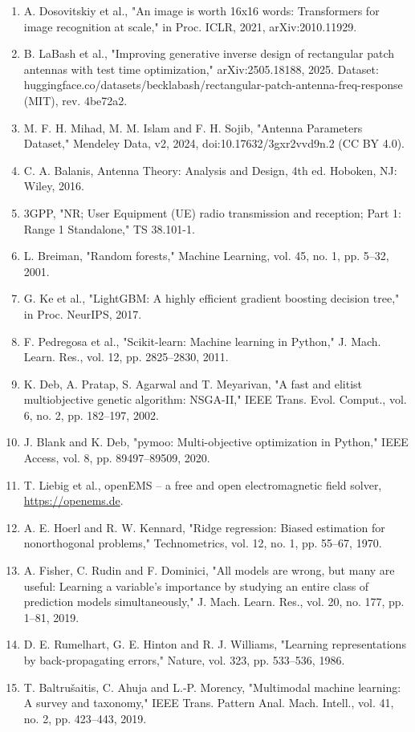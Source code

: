 \documentclass[11pt,a4paper]{article}
\begin{document}
\begin{enumerate}[leftmargin=*,itemsep=1pt]
\item A. Dosovitskiy et al., "An image is worth 16x16 words: Transformers for image recognition at scale," in Proc. ICLR, 2021, arXiv:2010.11929.
\item B. LaBash et al., "Improving generative inverse design of rectangular patch antennas with test time optimization," arXiv:2505.18188, 2025. Dataset: huggingface.co/datasets/becklabash/rectangular-patch-antenna-freq-response (MIT), rev. 4be72a2.
\item M. F. H. Mihad, M. M. Islam and F. H. Sojib, "Antenna Parameters Dataset," Mendeley Data, v2, 2024, doi:10.17632/3gxr2vvd9n.2 (CC BY 4.0).
\item C. A. Balanis, Antenna Theory: Analysis and Design, 4th ed. Hoboken, NJ: Wiley, 2016.
\item 3GPP, "NR; User Equipment (UE) radio transmission and reception; Part 1: Range 1 Standalone," TS 38.101-1.
\item L. Breiman, "Random forests," Machine Learning, vol. 45, no. 1, pp. 5--32, 2001.
\item G. Ke et al., "LightGBM: A highly efficient gradient boosting decision tree," in Proc. NeurIPS, 2017.
\item F. Pedregosa et al., "Scikit-learn: Machine learning in Python," J. Mach. Learn. Res., vol. 12, pp. 2825--2830, 2011.
\item K. Deb, A. Pratap, S. Agarwal and T. Meyarivan, "A fast and elitist multiobjective genetic algorithm: NSGA-II," IEEE Trans. Evol. Comput., vol. 6, no. 2, pp. 182--197, 2002.
\item J. Blank and K. Deb, "pymoo: Multi-objective optimization in Python," IEEE Access, vol. 8, pp. 89497--89509, 2020.
\item T. Liebig et al., openEMS -- a free and open electromagnetic field solver, \url{https://openems.de}.
\item A. E. Hoerl and R. W. Kennard, "Ridge regression: Biased estimation for nonorthogonal problems," Technometrics, vol. 12, no. 1, pp. 55--67, 1970.
\item A. Fisher, C. Rudin and F. Dominici, "All models are wrong, but many are useful: Learning a variable's importance by studying an entire class of prediction models simultaneously," J. Mach. Learn. Res., vol. 20, no. 177, pp. 1--81, 2019.
\item D. E. Rumelhart, G. E. Hinton and R. J. Williams, "Learning representations by back-propagating errors," Nature, vol. 323, pp. 533--536, 1986.
\item T. Baltrušaitis, C. Ahuja and L.-P. Morency, "Multimodal machine learning: A survey and taxonomy," IEEE Trans. Pattern Anal. Mach. Intell., vol. 41, no. 2, pp. 423--443, 2019.
\end{enumerate}
\newpage
\end{document}
